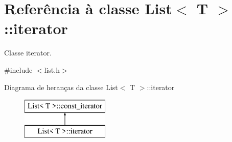 \hypertarget{class_list_1_1iterator}{}\section{Referência à classe List$<$ T $>$\+:\+:iterator}
\label{class_list_1_1iterator}


Classe iterator.  




{\ttfamily \#include $<$list.\+h$>$}

Diagrama de heranças da classe List$<$ T $>$\+:\+:iterator\begin{figure}[H]
\begin{center}
\leavevmode
\includegraphics[height=2.000000cm]{class_list_1_1iterator}
\end{center}
\end{figure}
